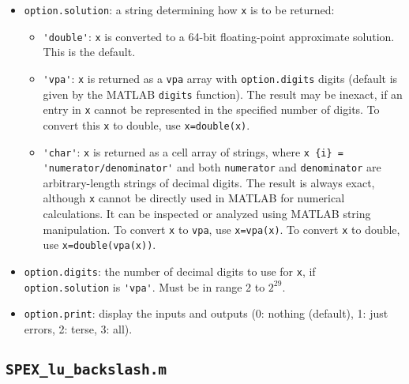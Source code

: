 \documentclass[12pt]{report}
\theoremstyle{definition}
\begin{document}
\begin{itemize}
\item \verb|option.solution|:
    a string determining how \verb|x| is to be returned:

    \begin{itemize}
        \item \verb|'double'|:  \verb|x| is converted to a 64-bit
            floating-point approximate solution.  This is the default.
        \item \verb|'vpa'|:  \verb|x| is returned as a \verb|vpa| array with
            \verb|option.digits| digits (default is given by the MATLAB
            \verb|digits| function).  The result may be inexact, if an entry in
            \verb|x| cannot be represented in the specified number of digits.
            To convert this \verb|x| to double, use \verb|x=double(x)|.
        \item \verb|'char'|:  \verb|x| is returned as a cell array of strings,
            where \verb|x {i} =| \newline \verb|'numerator/denominator'| and both
            \verb|numerator| and \verb|denominator| are arbitrary-length
            strings of decimal digits.  The result is always exact, although
            \verb|x| cannot be directly used in MATLAB for numerical
            calculations.  It can be inspected or analyzed using MATLAB string
            manipulation.  To convert \verb|x| to \verb|vpa|, use
            \verb|x=vpa(x)|.  To convert \verb|x| to double, use
            \verb|x=double(vpa(x))|.
    \end{itemize}

\item \verb|option.digits|: the number of decimal digits to use for \verb|x|, if
        \verb|option.solution| is \verb|'vpa'|.  Must be in range 2 to $2^{29}$.

\item \verb|option.print|: display the inputs and outputs
        (0: nothing (default), 1: just errors, 2: terse, 3: all).

\end{itemize}

\cprotect\subsection{\verb|SPEX_lu_backslash.m|}
\label{s:Use:MATLAB:factor}
\end{document}
